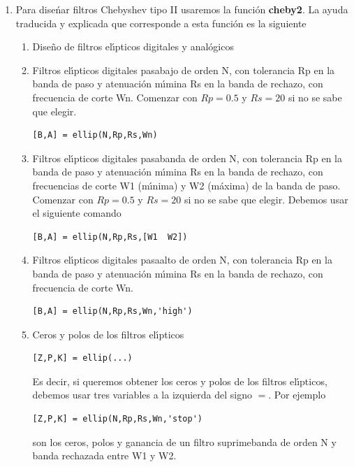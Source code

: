 \begin{enumerate}
\begin{enumerate}
                \item   Filtros anal\'{o}gicos
\begin{verbatim}
cheby2(N,Wn,'s'),
cheby2(N,Wn,'high','s')
cheby2(N,Wn,'stop','s')
\end{verbatim}
        \end{enumerate}

        \item   Para dise\'{n}ar  filtros Chebyshev tipo II usaremos la   funci\'{o}n \textbf{cheby2}.
        La ayuda traducida y explicada que corresponde a esta funci\'{o}n es la siguiente
        \begin{enumerate}
              \item   Dise\~{n}o de filtros el\'{\i}pticos  digitales y anal\'{o}gicos
        
              \item   Filtros el\'{\i}pticos  digitales pasabajo de orden N, con  tolerancia Rp en la
                      banda de paso y atenuaci\'{o}n m\'{\i}mina Rs en la banda de rechazo,  con
                      frecuencia de corte Wn. Comenzar con $Rp = 0.5$ y $Rs = 20$ si no se sabe que elegir.
\begin{verbatim}
[B,A] = ellip(N,Rp,Rs,Wn)
\end{verbatim}
                
                \item   Filtros el\'{\i}pticos  digitales pasabanda de orden N, con  tolerancia Rp en la
                        banda de paso y atenuaci\'{o}n m\'{\i}mina Rs en la banda de rechazo,  con
                        frecuencias de corte W1 (m\'{\i}nima) y W2 (m\'{a}xima) de la banda de paso.
                        Comenzar con $Rp = 0.5$ y $Rs = 20$ si no se sabe que elegir.
                        Debemos usar el siguiente comando
\begin{verbatim}
[B,A] = ellip(N,Rp,Rs,[W1  W2])
\end{verbatim}
                        
                \item   Filtros el\'{\i}pticos  digitales pasaalto de orden N, con  tolerancia Rp en la
                        banda de paso y atenuaci\'{o}n m\'{\i}mina Rs en la banda de rechazo,  con
                        frecuencia de corte Wn.
\begin{verbatim}
[B,A] = ellip(N,Rp,Rs,Wn,'high')
\end{verbatim}

                \item   Ceros y polos de los filtros el\'{\i}pticos
\begin{verbatim}
[Z,P,K] = ellip(...)
\end{verbatim}
                Es decir, si queremos obtener los ceros y polos de los filtros el\'{\i}pticos, debemos usar
                tres variables a la izquierda del signo $=$. Por ejemplo
\begin{verbatim}
[Z,P,K] = ellip(N,Rp,Rs,Wn,'stop')
\end{verbatim}
               son los ceros, polos y ganancia de un filtro suprimebanda de orden N y banda rechazada entre
               W1 y W2.


\end{enumerate}
\end{enumerate}
